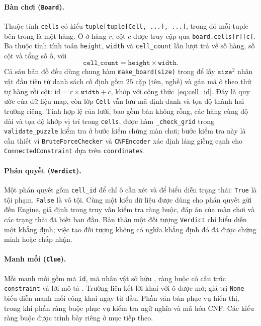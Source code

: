 \begin{sloppypar}
\paragraph{Bàn chơi (\texttt{Board}).}
Thuộc tính \texttt{cells} có kiểu \texttt{tuple[tuple[Cell, ...], ...]}, trong đó mỗi tuple bên trong là một hàng. Ô ở hàng $r$, cột $c$ được truy cập qua \texttt{board.cells[r][c]}. Ba thuộc tính tính toán \texttt{height}, \texttt{width} và \texttt{cell\_count} lần lượt trả về số hàng, số cột và tổng số ô, với
\[
    \texttt{cell\_count}=\texttt{height}\times\texttt{width}.
\]
Cả sáu bản đồ đều dùng chung hàm \texttt{make\_board(size)} trong  để lấy $\texttt{size}^2$ nhân vật đầu tiên từ danh sách cố định gồm $25$ cặp (tên, nghề) và gán mã ô theo thứ tự hàng rồi cột: $\mathrm{id}=r\times\texttt{width}+c$, khớp với công thức~\eqref{eq:cell_id}. Đây là quy ước của dữ liệu map, còn lớp \texttt{Cell} vẫn lưu mã định danh và tọa độ thành hai trường riêng. Tính hợp lệ của lưới, bao gồm bàn không rỗng, các hàng cùng độ dài và tọa độ khớp vị trí trong \texttt{cells}, được hàm \texttt{\_check\_grid} trong \texttt{validate\_puzzle} kiểm tra ở bước kiểm chứng màn chơi; bước kiểm tra này là cần thiết vì \texttt{BruteForceChecker} và \texttt{CNFEncoder} xác định láng giềng cạnh cho \texttt{ConnectedConstraint} dựa trên \texttt{coordinates}.

\paragraph{Phán quyết (\texttt{Verdict}).}
Một phán quyết gồm \texttt{cell\_id} để chỉ ô cần xét và  để biểu diễn trạng thái: \texttt{True} là tội phạm, \texttt{False} là vô tội. Cùng một kiểu dữ liệu được dùng cho phán quyết gửi đến Engine, giả định trong truy vấn kiểm tra ràng buộc, đáp án của màn chơi và các trạng thái đã biết ban đầu. Bản thân một đối tượng \texttt{Verdict} chỉ biểu diễn một khẳng định; việc tạo đối tượng không có nghĩa khẳng định đó đã được chứng minh hoặc chấp nhận.

\paragraph{Manh mối (\texttt{Clue}).}
Mỗi manh mối gồm mã \texttt{id}, mã nhân vật sở hữu , ràng buộc có cấu trúc \texttt{constraint} và lời mô tả . Trường  liên kết lời khai với ô được mở; giá trị \texttt{None} biểu diễn manh mối công khai ngay từ đầu. Phần văn bản phục vụ hiển thị, trong khi phần ràng buộc phục vụ kiểm tra ngữ nghĩa và mã hóa CNF. Các kiểu ràng buộc được trình bày riêng ở mục tiếp theo.


\end{sloppypar}
